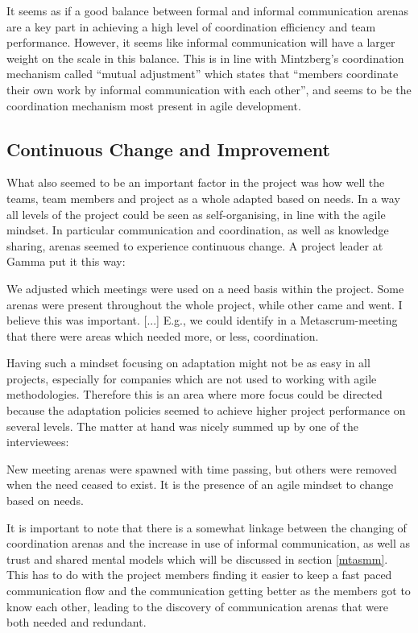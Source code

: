 It seems as if a good balance between formal and informal communication arenas are a key part in achieving a high level of coordination efficiency and team performance. However, it seems like informal communication will have a larger weight on the scale in this balance. This is in line with Mintzberg's \cite{} coordination mechanism called ``mutual adjustment'' which states that ``members coordinate their own work by informal communication with each other'', and seems to be the coordination mechanism most present in agile development.

\subsection{Continuous Change and Improvement}

What also seemed to be an important factor in the project was how well the teams, team members and project as a whole adapted based on needs. In a way all levels of the project could be seen as self-organising, in line with the agile mindset. In particular communication and coordination, as well as knowledge sharing, arenas seemed to experience continuous change. A project leader at Gamma put it this way:

\begin{fancyquotes}
We adjusted which meetings were used on a need basis within the project. Some arenas were present throughout the whole project, while other came and went. I believe this was important. [...] E.g., we could identify in a Metascrum-meeting that there were areas which needed more, or less, coordination.
\end{fancyquotes}

Having such a mindset focusing on adaptation might not be as easy in all projects, especially for companies which are not used to working with agile methodologies. Therefore this is an area where more focus could be directed because the adaptation policies seemed to achieve higher project performance on several levels. The matter at hand was nicely summed up by one of the interviewees:

\begin{fancyquotes}
New meeting arenas were spawned with time passing, but others were removed when the need ceased to exist. It is the presence of an agile mindset to change based on needs.
\end{fancyquotes}

It is important to note that there is a somewhat linkage between the changing of coordination arenas and the increase in use of informal communication, as well as trust and shared mental models which will be discussed in section \ref{mtasmm}. This has to do with the project members finding it easier to keep a fast paced communication flow and the communication getting better as the members got to know each other, leading to the discovery of communication arenas that were both needed and redundant.

